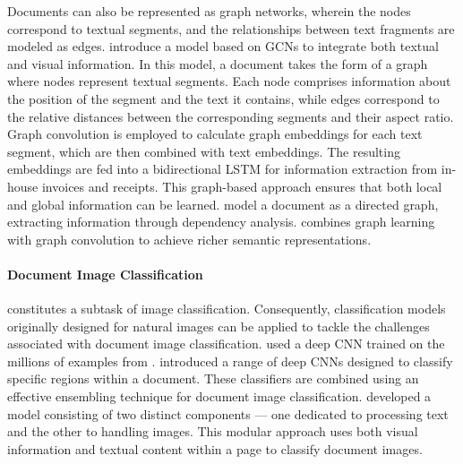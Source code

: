 Documents can also be represented as graph networks, wherein the nodes correspond to textual segments, and the relationships between text fragments are modeled as edges. \citet{liu2019graph} introduce a model based on \acp{GCN} to integrate both textual and visual information. In this model, a document takes the form of a graph where nodes represent textual segments. Each node comprises information about the position of the segment and the text it contains, while edges correspond to the relative distances between the corresponding segments and their aspect ratio. Graph convolution is employed to calculate graph embeddings for each text segment, which are then combined with text embeddings. The resulting embeddings are fed into a bidirectional \ac{LSTM} for information extraction from in-house invoices and receipts. This graph-based approach ensures that both local and global information can be learned. \citet{hwang2020spatial} model a document as a directed graph, extracting information through dependency analysis. \citet{yu2021pick} combines graph learning with graph convolution to achieve richer semantic representations. \\

\paragraph{Document Image Classification} constitutes a subtask of image classification. Consequently, classification models originally designed for natural images can be applied to tackle the challenges associated with document image classification. \citet{afzal2015deepdocclassifier} used a deep \ac{CNN} trained on the millions of examples from \citep{deng2009imagenet}. \citet{das2018document} introduced a range of deep \acp{CNN} designed to classify specific regions within a document. These classifiers are combined using an effective ensembling technique for document image classification. \citet{dauphinee2019modular}  developed a model consisting of two distinct components — one dedicated to processing text and the other to handling images. This modular approach uses both visual information and textual content within a page to classify document images.

